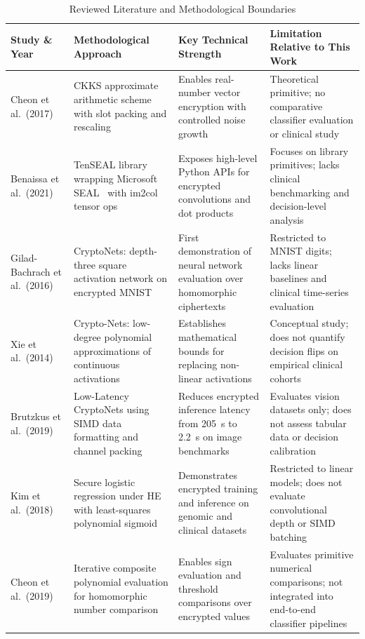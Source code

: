 \documentclass[conference]{IEEEtran}
\begin{document}
\begin{table}[t]
\caption{Reviewed Literature and Methodological Boundaries}
\label{tab:related}
\centering
\footnotesize
\begin{tabular}{L{3.2cm} L{4.0cm} L{4.0cm} L{4.0cm}}
\toprule
\textbf{Study \& Year} & \textbf{Methodological Approach} & \textbf{Key Technical Strength} & \textbf{Limitation Relative to This Work} \\
\midrule
Cheon et al.\ (2017)~\cite{cheon2017} & CKKS approximate arithmetic scheme with slot packing and rescaling & Enables real-number vector encryption with controlled noise growth & Theoretical primitive; no comparative classifier evaluation or clinical study \\
Benaissa et al.\ (2021)~\cite{tenseal2021} & TenSEAL library wrapping Microsoft SEAL~\cite{seal2020} with im2col tensor ops & Exposes high-level Python APIs for encrypted convolutions and dot products & Focuses on library primitives; lacks clinical benchmarking and decision-level analysis \\
Gilad-Bachrach et al.\ (2016)~\cite{cryptonets2016} & CryptoNets: depth-three square activation network on encrypted MNIST & First demonstration of neural network evaluation over homomorphic ciphertexts & Restricted to MNIST digits; lacks linear baselines and clinical time-series evaluation \\
Xie et al.\ (2014)~\cite{xie2014} & Crypto-Nets: low-degree polynomial approximations of continuous activations & Establishes mathematical bounds for replacing non-linear activations & Conceptual study; does not quantify decision flips on empirical clinical cohorts \\
Brutzkus et al.\ (2019)~\cite{brutzkus2019} & Low-Latency CryptoNets using SIMD data formatting and channel packing & Reduces encrypted inference latency from 205~s to 2.2~s on image benchmarks & Evaluates vision datasets only; does not assess tabular data or decision calibration \\
Kim et al.\ (2018)~\cite{kim2018} & Secure logistic regression under HE with least-squares polynomial sigmoid & Demonstrates encrypted training and inference on genomic and clinical datasets & Restricted to linear models; does not evaluate convolutional depth or SIMD batching \\
Cheon et al.\ (2019)~\cite{cheon2019} & Iterative composite polynomial evaluation for homomorphic number comparison & Enables sign evaluation and threshold comparisons over encrypted values & Evaluates primitive numerical comparisons; not integrated into end-to-end classifier pipelines \\

\end{tabular}
\end{table}
\end{document}
